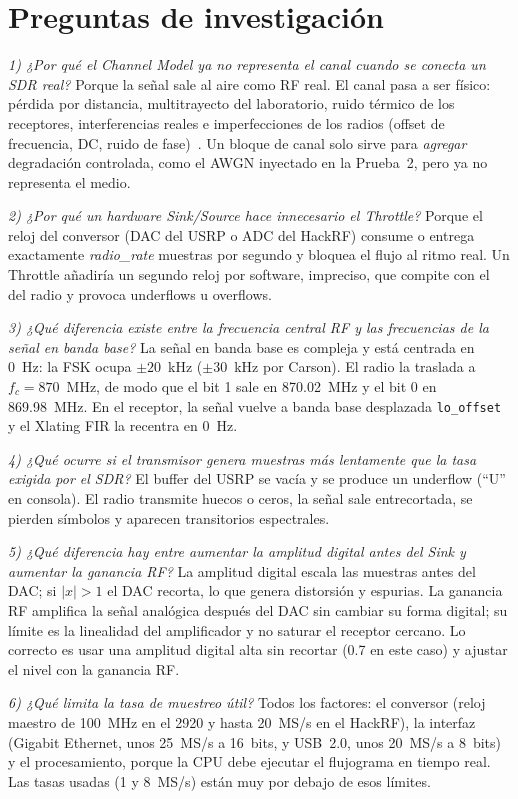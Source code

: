 \documentclass[conference]{IEEEtran}
\begin{document}
\section{Preguntas de investigación}

\textit{1) ¿Por qué el Channel Model ya no representa el canal cuando se conecta un SDR real?} Porque la señal sale al aire como RF real. El canal pasa a ser físico: pérdida por distancia, multitrayecto del laboratorio, ruido térmico de los receptores, interferencias reales e imperfecciones de los radios (offset de frecuencia, DC, ruido de fase)~\cite{proakis}. Un bloque de canal solo sirve para \emph{agregar} degradación controlada, como el AWGN inyectado en la Prueba~2, pero ya no representa el medio.

\textit{2) ¿Por qué un hardware Sink/Source hace innecesario el Throttle?} Porque el reloj del conversor (DAC del USRP o ADC del HackRF) consume o entrega exactamente \textit{radio\_rate} muestras por segundo y bloquea el flujo al ritmo real. Un Throttle añadiría un segundo reloj por software, impreciso, que compite con el del radio y provoca underflows u overflows.

\textit{3) ¿Qué diferencia existe entre la frecuencia central RF y las frecuencias de la señal en banda base?} La señal en banda base es compleja y está centrada en 0~Hz: la FSK ocupa $\pm 20$~kHz ($\pm 30$~kHz por Carson). El radio la traslada a $f_c = 870$~MHz, de modo que el bit 1 sale en 870.02~MHz y el bit 0 en 869.98~MHz. En el receptor, la señal vuelve a banda base desplazada \texttt{lo\_offset} y el Xlating FIR la recentra en 0~Hz.

\textit{4) ¿Qué ocurre si el transmisor genera muestras más lentamente que la tasa exigida por el SDR?} El buffer del USRP se vacía y se produce un underflow (``U'' en consola). El radio transmite huecos o ceros, la señal sale entrecortada, se pierden símbolos y aparecen transitorios espectrales.

\textit{5) ¿Qué diferencia hay entre aumentar la amplitud digital antes del Sink y aumentar la ganancia RF?} La amplitud digital escala las muestras antes del DAC; si $|x| > 1$ el DAC recorta, lo que genera distorsión y espurias. La ganancia RF amplifica la señal analógica después del DAC sin cambiar su forma digital; su límite es la linealidad del amplificador y no saturar el receptor cercano. Lo correcto es usar una amplitud digital alta sin recortar (0.7 en este caso) y ajustar el nivel con la ganancia RF.

\textit{6) ¿Qué limita la tasa de muestreo útil?} Todos los factores: el conversor (reloj maestro de 100~MHz en el 2920 y hasta 20~MS/s en el HackRF), la interfaz (Gigabit Ethernet, unos 25~MS/s a 16~bits, y USB~2.0, unos 20~MS/s a 8~bits) y el procesamiento, porque la CPU debe ejecutar el flujograma en tiempo real. Las tasas usadas (1 y 8~MS/s) están muy por debajo de esos límites.
\end{document}
